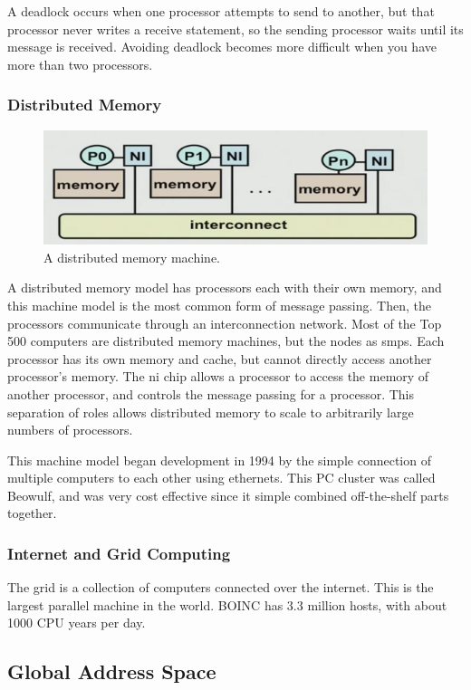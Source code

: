 \documentclass[10pt]{article}
\begin{document}
\begin{flushleft}
A deadlock occurs when one processor attempts to send to another, but that processor never writes a receive statement, so the sending processor waits until its message is received. Avoiding deadlock becomes more difficult when you have more than two processors. 

\subsubsection{Distributed Memory}

\begin{figure}[H]
\centering
\includegraphics[width=0.5\linewidth]{figures/distributed-memory.pdf}
\caption{A distributed memory machine.}
\end{figure}

A distributed memory model has processors each with their own memory, and this machine model is the most common form of message passing. Then, the processors communicate through an interconnection network. Most of the Top 500 computers are distributed memory machines, but the nodes as \gls{smp}s. Each processor has its own memory and cache, but cannot directly access another processor's memory. The \gls{ni} chip allows a processor to access the memory of another processor, and controls the message passing for a processor. This separation of roles allows distributed memory to scale to arbitrarily large numbers of processors.

This machine model began development in 1994 by the simple connection of multiple computers to each other using ethernets. This PC cluster was called Beowulf, and was very cost effective since it simple combined off-the-shelf parts together. 

\subsubsection{Internet and Grid Computing}

The grid is a collection of computers connected over the internet. This is the largest parallel machine in the world. BOINC has 3.3 million hosts, with about 1000 CPU years per day. 

\subsection{Global Address Space}


\end{flushleft}
\end{document}
